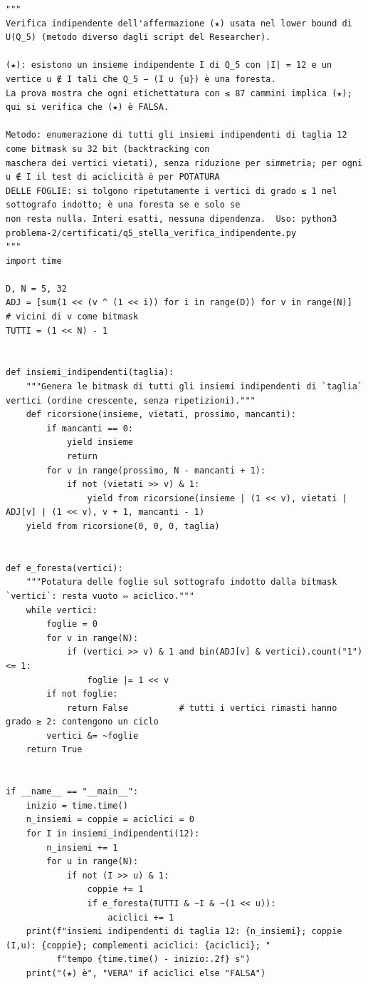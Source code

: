 \documentclass[11pt,a4paper]{article}
\begin{document}
\begin{lstlisting}[caption={certificati/q5\_stella\_verifica\_indipendente.py}]
"""
Verifica indipendente dell'affermazione (★) usata nel lower bound di U(Q_5) (metodo diverso dagli script del Researcher).

(★): esistono un insieme indipendente I di Q_5 con |I| = 12 e un vertice u ∉ I tali che Q_5 − (I ∪ {u}) è una foresta.
La prova mostra che ogni etichettatura con ≤ 87 cammini implica (★); qui si verifica che (★) è FALSA.

Metodo: enumerazione di tutti gli insiemi indipendenti di taglia 12 come bitmask su 32 bit (backtracking con
maschera dei vertici vietati), senza riduzione per simmetria; per ogni u ∉ I il test di aciclicità è per POTATURA
DELLE FOGLIE: si tolgono ripetutamente i vertici di grado ≤ 1 nel sottografo indotto; è una foresta se e solo se
non resta nulla. Interi esatti, nessuna dipendenza.  Uso: python3 problema-2/certificati/q5_stella_verifica_indipendente.py
"""
import time

D, N = 5, 32
ADJ = [sum(1 << (v ^ (1 << i)) for i in range(D)) for v in range(N)]   # vicini di v come bitmask
TUTTI = (1 << N) - 1


def insiemi_indipendenti(taglia):
    """Genera le bitmask di tutti gli insiemi indipendenti di `taglia` vertici (ordine crescente, senza ripetizioni)."""
    def ricorsione(insieme, vietati, prossimo, mancanti):
        if mancanti == 0:
            yield insieme
            return
        for v in range(prossimo, N - mancanti + 1):
            if not (vietati >> v) & 1:
                yield from ricorsione(insieme | (1 << v), vietati | ADJ[v] | (1 << v), v + 1, mancanti - 1)
    yield from ricorsione(0, 0, 0, taglia)


def e_foresta(vertici):
    """Potatura delle foglie sul sottografo indotto dalla bitmask `vertici`: resta vuoto ⇔ aciclico."""
    while vertici:
        foglie = 0
        for v in range(N):
            if (vertici >> v) & 1 and bin(ADJ[v] & vertici).count("1") <= 1:
                foglie |= 1 << v
        if not foglie:
            return False          # tutti i vertici rimasti hanno grado ≥ 2: contengono un ciclo
        vertici &= ~foglie
    return True


if __name__ == "__main__":
    inizio = time.time()
    n_insiemi = coppie = aciclici = 0
    for I in insiemi_indipendenti(12):
        n_insiemi += 1
        for u in range(N):
            if not (I >> u) & 1:
                coppie += 1
                if e_foresta(TUTTI & ~I & ~(1 << u)):
                    aciclici += 1
    print(f"insiemi indipendenti di taglia 12: {n_insiemi}; coppie (I,u): {coppie}; complementi aciclici: {aciclici}; "
          f"tempo {time.time() - inizio:.2f} s")
    print("(★) è", "VERA" if aciclici else "FALSA")

\end{lstlisting}
\end{document}
